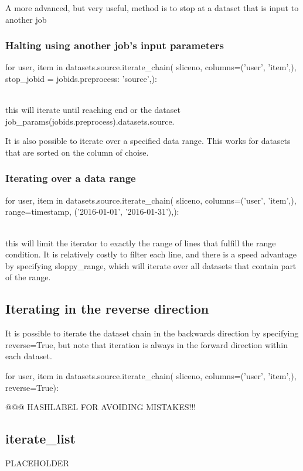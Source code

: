 A more advanced, but very useful, method is to stop at a dataset that
is input to another job

\subsubsection*{Halting using another job's input parameters}
\begin{python}
for user, item in datasets.source.iterate_chain(
    sliceno,
    columns=('user', 'item',),
    stop_jobid = {jobids.preprocess: 'source',}):
\end{python}
\\
this will iterate until reaching end or the dataset
job\_params(jobids.preprocess).datasets.source.

It is also possible to iterate over a specified data range.  This
works for datasets that are sorted on the column of choise.

\subsubsection*{Iterating over a data range}
\begin{python}
for user, item in datasets.source.iterate_chain(
    sliceno,
    columns=('user', 'item',),
    range={timestamp, ('2016-01-01', '2016-01-31'),}):
\end{python}
\\
this will limit the iterator to exactly the range of lines that
fulfill the range condition.  It is relatively costly to filter each
line, and there is a speed advantage by specifying sloppy\_range,
which will iterate over all datasets that contain part of the range.

\subsection{Iterating in the reverse direction}

It is possible to iterate the dataset chain in the backwards direction
by specifying reverse=True, but note that iteration is always in the
forward direction within each dataset.

\begin{python}
for user, item in datasets.source.iterate_chain(
    sliceno,
    columns=('user', 'item',),
    reverse=True):
\end{python}

@@@ HASHLABEL FOR AVOIDING MISTAKES!!!

\subsection{iterate\_list}
PLACEHOLDER


